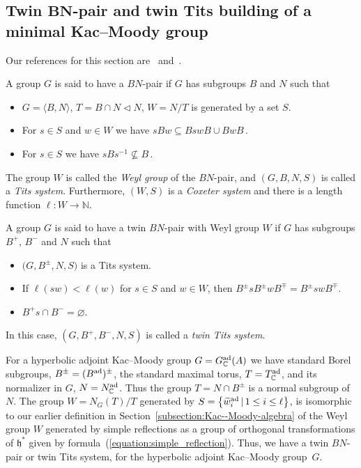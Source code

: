 \documentclass[pdftex]{sigma}
\numberwithin{equation}{section}
\def\C{{\mathbb C}}
\def\N{\mathbb{N}}
\def\wtil{\widetilde w}
\def\la{\langle}
\def\ra{\rangle}
\def\h{\mathfrak{h}}
\begin{document}
\subsection[Twin $BN$-pair and twin Tits building of a minimal Kac--Moody group]{Twin $\boldsymbol{BN}$-pair and twin Tits building of a minimal Kac--Moody group}\label{subsection:BNpair_Tits_building}

Our references for this section are~\cite[Sections 6.2 and 6.3]{AbramenkoBrown08} and~\cite[Chapters~5 and~11]{Ronan89}.
\begin{Definition}[BN-pair]\label{definition:BN-pair} A group $G$ is said to have a $BN$-pair if $G$ has subgroups $B$ and $N$ such that
\begin{itemize}\itemsep=0pt
\item[T1:] $G=\la B,N\ra$, $T = B\cap N \lhd N$, $W = N/T$ is generated by a set $S$.
\item[T2:] For $s\in S$ and $w\in W$ we have $sB w\subseteq B s wB \cup B wB\,$.
\item[T3:] For $s\in S$ we have $sB s^{-1}\not\subseteq B\,$.
\end{itemize}
The group $W$ is called the {\it Weyl group} of the $BN$-pair, and $(G,B,N,S)$ is called a {\it Tits system}. Furthermore, $(W,S)$ is a {\it Coxeter system} and there is a length function $\ell\colon W\to\N$.
\end{Definition}
\begin{Definition} \label{definition:Twin-BN-pair}
A group $G$ is said to have a twin $BN$-pair with Weyl group $W$ if $G$ has subgroups $B^+$, $B^-$ and $N$ such that
\begin{itemize}\itemsep=0pt
\item[TW1:] $\big(G,B^\pm,N,S\big)$ is a Tits system.
\item[TW2:] If $\ell(sw) < \ell(w)$ for $s\in S$ and $w\in W$, then $B^\pm s B^\pm w B^\mp = B^\pm sw B^\mp$.
\item[TW3:] $B^+ s \cap B^- = \varnothing$.
\end{itemize}
In this case, $(G,B^+,B^-,N,S)$ is called a {\it twin Tits system}.
\end{Definition}

For a hyperbolic adjoint Kac--Moody group $G = G^{\rm ad}_\C(A)$ we have standard Borel subgroups,
$B^{\pm} = (B^{\rm ad})^\pm$, the standard maximal torus, $T = T^{\rm ad}_\C$, and its normalizer in $G$,
$N = N_\C^{\rm ad}$. Thus the group $T = N\cap B^{\pm}$ is a normal subgroup of $N$.
The group $W = N_G(T)/T$ generated by $S = \big\{\wtil^{\rm ad}_i\,|\, 1\leq i\leq\ell\big\}$, is isomorphic to our
earlier definition in Section~\ref{subsection:Kac--Moody-algebra}
of the Weyl group $W$ generated by simple reflections as a group of orthogonal transformations of $\h^*$ given by formula~(\ref{equation:simple_reflection}). Thus, we have a twin $BN$-pair or twin Tits system, for the hyperbolic adjoint Kac--Moody group~$G$.
\end{document}
